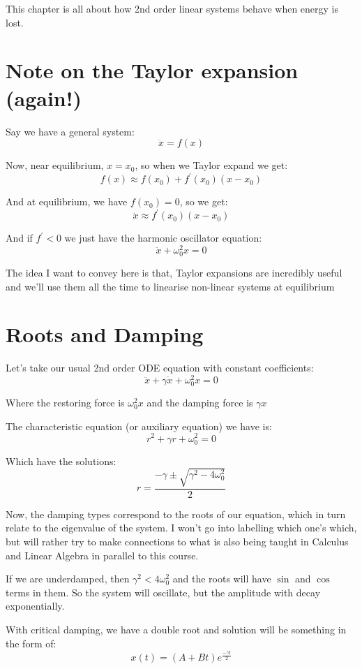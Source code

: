 This chapter is all about how 2nd order linear systems behave when energy is lost. 

\section{Note on the Taylor expansion (again!)}

Say we have a general system: 
$$
\ddot{x} = f(x)
$$

Now, near equilibrium, $x = x_0$, so when we Taylor expand we get: 
$$
f(x) \approx f(x_0) + f^{\prime}(x_0)(x-x_0) 
$$

And at equilibrium, we have $f(x_0) = 0$, so we get: 
$$
\ddot{x} \approx f^{\prime} (x_0)(x-x_0) 
$$

And if $f^{\prime} <0$ we just have the harmonic oscillator equation: 
$$
\ddot{x} + \omega_0^2 x = 0 
$$

The idea I want to convey here is that, Taylor expansions are incredibly useful and we'll use them all the time to linearise non-linear systems at equilibrium 

\section{Roots and Damping}

Let's take our usual 2nd order ODE equation with constant coefficients: 
$$
\ddot{x} + \gamma \dot{x} + \omega_0^2 x = 0  
$$

Where the restoring force is $\omega_0^2x$ and the damping force is $\gamma x$

The characteristic equation (or auxiliary equation) we have is: 
$$
r^2 + \gamma r + \omega_0^2 = 0
$$

Which have the solutions: 
$$
r = \frac{-\gamma \pm \sqrt{\gamma^2 - 4 \omega_0^2}}{2}
$$

Now, the damping types correspond to the roots of our equation, which in turn relate to the eigenvalue of the system. I won't go into labelling which one's which, but will rather try to make connections to what is also being taught in Calculus and Linear Algebra in parallel to this course. 

If we are underdamped, then $\gamma^2 < 4 \omega_0^2$ and the roots will have $\sin$ and $\cos$ terms in them. So the system will oscillate, but the amplitude with decay exponentially. 

With critical damping, we have a double root and solution will be something in the form of: 
$$
x(t) = (A+ Bt) e^{\frac{- \gamma t}{2}}
$$

